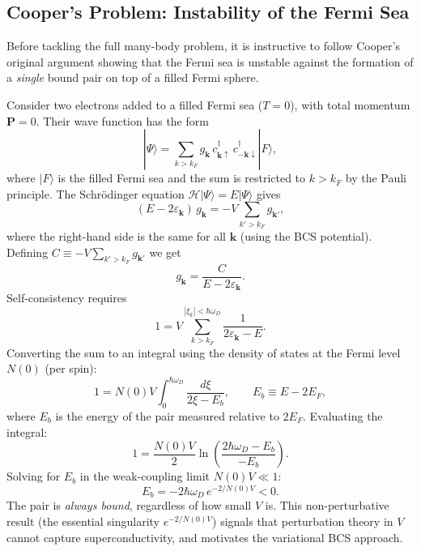 \subsection{Cooper's Problem: Instability of the Fermi Sea}

Before tackling the full many-body problem, it is instructive to follow
Cooper's original argument \cite{Cooper1956} showing that the Fermi sea is
unstable against the formation of a \emph{single} bound pair on top of a
filled Fermi sphere.

Consider two electrons added to a filled Fermi sea ($T=0$), with total
momentum $\mathbf{P} = 0$. Their wave function has the form
\begin{equation}
	|\Psi\rangle = \sum_{k > k_F} g_{\mathbf{k}}\,
	c^\dagger_{\mathbf{k}\uparrow}\, c^\dagger_{-\mathbf{k}\downarrow}
	|F\rangle,
\end{equation}
where $|F\rangle$ is the filled Fermi sea and the sum is restricted to
$k > k_F$ by the Pauli principle. The Schr\"odinger equation
$\mathcal{H}|\Psi\rangle = E|\Psi\rangle$ gives
\begin{equation}
	(E - 2\varepsilon_{\mathbf{k}})\,g_{\mathbf{k}}
	= -V \sum_{k'>k_F} g_{\mathbf{k}'},
\end{equation}
where the right-hand side is the same for all $\mathbf{k}$ (using the BCS
potential). Defining $C \equiv -V\sum_{k'>k_F} g_{\mathbf{k}'}$ we get
\begin{equation}
	g_{\mathbf{k}} = \frac{C}{E - 2\varepsilon_{\mathbf{k}}}.
\end{equation}
Self-consistency requires
\begin{equation}
	1 = V \sum_{k > k_F}^{|\xi_k| < \hbar\omega_D}
	\frac{1}{2\varepsilon_{\mathbf{k}} - E}.
\end{equation}
Converting the sum to an integral using the density of states at the Fermi
level $N(0)$ (per spin):
\begin{equation}
	1 = N(0)V \int_0^{\hbar\omega_D}
	\frac{d\xi}{2\xi - E_b}, \qquad E_b \equiv E - 2E_F,
\end{equation}
where $E_b$ is the energy of the pair measured relative to $2E_F$. Evaluating
the integral:
\begin{equation}
	1 = \frac{N(0)V}{2} \ln\!\left(\frac{2\hbar\omega_D - E_b}{-E_b}\right).
\end{equation}
Solving for $E_b$ in the weak-coupling limit $N(0)V \ll 1$:
\begin{equation}
	\boxed{E_b = -2\hbar\omega_D\,e^{-2/N(0)V} < 0.}
	\label{eq:Cooper_binding}
\end{equation}
The pair is \emph{always bound}, regardless of how small $V$ is. This
non-perturbative result (the essential singularity $e^{-2/N(0)V}$) signals
that perturbation theory in $V$ cannot capture superconductivity, and
motivates the variational BCS approach.

